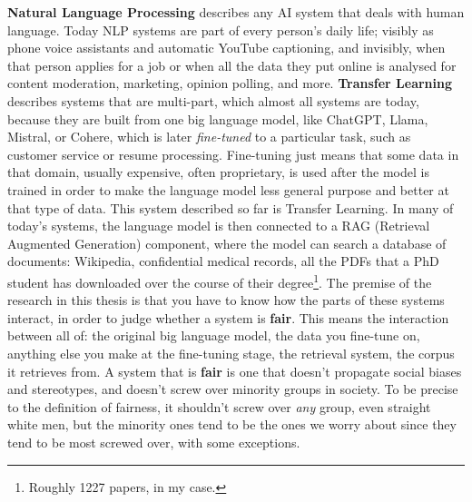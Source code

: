 \documentclass[phd,ilcc,oneside,leftchapter,parskip]{infthesis}
\begin{document}
\begin{preliminary}

\maketitle

\begin{laysummary}
\textbf{Natural Language Processing} describes any AI system that deals with human language. Today NLP systems are part of every person's daily life; visibly as phone voice assistants and automatic YouTube captioning, and invisibly, when that person applies for a job or when all the data they put online is analysed for content moderation, marketing, opinion polling, and more. \textbf{Transfer Learning} describes systems that are multi-part, which almost all systems are today, because they are built from one big language model, like ChatGPT, Llama, Mistral, or Cohere, which is later \textit{fine-tuned} to a particular task, such as customer service or resume processing. Fine-tuning just means that some data in that domain, usually expensive, often proprietary, is used after the model is trained in order to make the language model less general purpose and better at that type of data. This system described so far is Transfer Learning. In many of today's systems, the language model is then connected to a RAG (Retrieval Augmented Generation) component, where the model can search a database of documents: Wikipedia, confidential medical records, all the PDFs that a PhD student has downloaded over the course of their degree\footnote{Roughly 1227 papers, in my case.}. The premise of the research in this thesis is that you have to know how the parts of these systems interact, in order to judge whether a system is \textbf{fair}. This means the interaction between all of: the original big language model, the data you fine-tune on, anything else you make at the fine-tuning stage, the retrieval system, the corpus it retrieves from. A system that is \textbf{fair} is one that doesn't propagate social biases and stereotypes, and doesn't screw over minority groups in society. To be precise to the definition of fairness, it shouldn't screw over \textit{any} group, even straight white men, but the minority ones tend to be the ones we worry about since they tend to be most screwed over, with some exceptions. 


\end{laysummary}
\end{preliminary}
\end{document}
